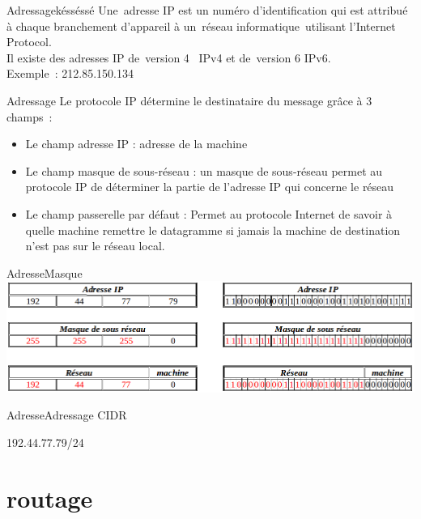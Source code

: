 \documentclass{beamer}
\begin{document}
	\begin{frame}{Adressage}{késséssé}
		Une adresse IP est un numéro d'identification qui est attribué à chaque branchement d'appareil à un réseau informatique utilisant l'Internet Protocol.\\
		Il existe des adresses IP de version 4  IPv4 et de version 6 IPv6.\\
		Exemple : 212.85.150.134 
	\end{frame}

	\begin{frame}{Adressage}
		Le protocole IP détermine le destinataire du message grâce à 3 champs :
		\begin{itemize}
		\item[\textbullet] Le champ adresse IP : adresse de la machine
		\item[\textbullet] Le champ masque de sous-réseau : un masque de sous-réseau permet au protocole IP de déterminer la partie de l'adresse IP qui concerne le réseau
		\item[\textbullet] Le champ passerelle par défaut : Permet au protocole Internet de savoir à quelle machine remettre le datagramme si jamais la machine de destination n'est pas sur le réseau local. 
		\end{itemize}
	\end{frame}

	\begin{frame}{Adresse}{Masque}
		\includegraphics[scale=0.33]{masque.png}
	\end{frame}

	\begin{frame}{Adresse}{Adressage CIDR}
	\begin{center}
		192.44.77.79/24
	\end{center}
	\end{frame}

\section{routage}
\end{document}
